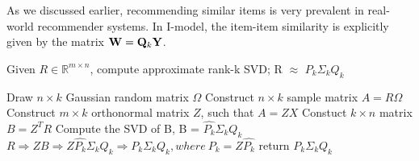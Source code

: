 
As we discussed earlier, recommending similar items is very prevalent in real-world recommender systems.
In I-\LinearLow model, the item-item similarity is explicitly given by the matrix $\mathbf{W} = \mathbf{Q}_k \mathbf{Y} $. 


\begin{algorithm}
        \small
        \caption{Given $R \in \mathbb{R}^{m \times n}$, compute approximate rank-k SVD; R $\approx$ $P_k \Sigma_k Q_k$}
        \label{algo:RSVD}
        \begin{algorithmic}[1]

        \State Draw $n\times k$ Gaussian random matrix $\Omega$
        \State Construct $n\times k$ sample matrix $A = R\Omega$
        \State Construct $m\times k$ orthonormal matrix $Z$, such that $A  = ZX$
        \State Constuct $k\times n$ matrix $B = Z^TR$
        \State Compute the SVD of B, B =  $\hat{P_k} \Sigma_k Q_k$
        \State  $R \Rightarrow ZB \Rightarrow Z \hat{P_k} \Sigma_k Q_k \Rightarrow  P_k \Sigma_k Q_k, where\ P_k = Z \hat{P_k}$
        \State return $P_k \Sigma_k Q_k$
        \EndProcedure
        \end{algorithmic}
\end{algorithm}



